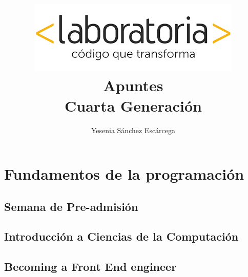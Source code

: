 \documentclass{book}
\title{\vspace{-8cm}\includegraphics[width=\textwidth]{laboratoria/img/laboratoria}\\\vspace{3cm} Apuntes\\ Cuarta Generación\vspace{2cm}}
\author{Yesenia Sánchez Escárcega}
\begin{document}
\maketitle
\tableofcontents

\part{Fundamentos de la programación}

\chapter{Semana de Pre-admisión}

    

\chapter{Introducción a Ciencias de la Computación}

    

\chapter{Becoming a Front End engineer}

    
\end{document}
